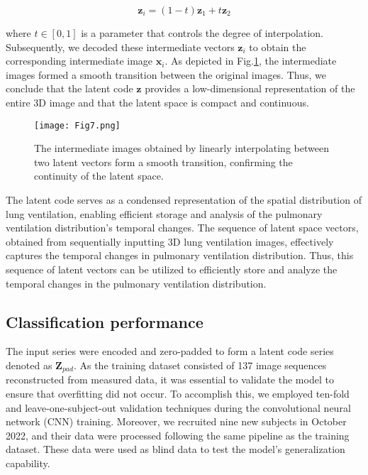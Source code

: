 \documentclass[journal,twoside,web]{ieeecolor}
\begin{document}
\begin{equation}
	\bm z_{i} = (1-t)\bm z_{1} + t\bm z_{2}
\end{equation}

where $t \in [0,1]$ is a parameter that controls the degree of interpolation. Subsequently, we decoded these intermediate vectors $\bm z_i$ to obtain the corresponding intermediate image $\bm x_i$. As depicted in Fig.\ref{连续性}, the intermediate images formed a smooth transition between the original images. Thus, we conclude that the latent code $\bm z$ provides a low-dimensional representation of the entire 3D image and that the latent space is compact and continuous. 

\begin{figure}[!htbp] 
	\centering
	\texttt{[image: Fig7.png]}
	\caption{The intermediate images obtained by linearly interpolating between two latent vectors form a smooth transition, confirming the continuity of the latent space.}
	\label{连续性}
\end{figure}

The latent code serves as a condensed representation of the spatial distribution of lung ventilation, enabling efficient storage and analysis of the pulmonary ventilation distribution's temporal changes. The sequence of latent space vectors, obtained from sequentially inputting 3D lung ventilation images, effectively captures the temporal changes in pulmonary ventilation distribution. Thus, this sequence of latent vectors can be utilized to efficiently store and analyze the temporal changes in the pulmonary ventilation distribution.



\subsection{Classification performance}
The input series were encoded and zero-padded to form a latent code series denoted as $\bm Z_{pad}$. As the training dataset consisted of 137 image sequences reconstructed from measured data, it was essential to validate the model to ensure that overfitting did not occur. To accomplish this, we employed ten-fold and leave-one-subject-out validation techniques during the convolutional neural network (CNN) training. Moreover, we recruited nine new subjects in October 2022, and their data were processed following the same pipeline as the training dataset. These data were used as blind data to test the model's generalization capability.
\end{document}
